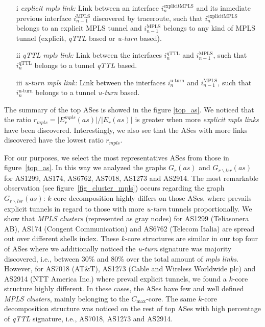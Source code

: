 \begin{itemize}
\item[i] \textit{explicit mpls link:} Link between an interface $i^{\text{explicitMPLS}}_{n}$  and its inmediate previous interface $i^{\text{MPLS}}_{n-1}$ discovered by traceroute, such that $i^{\text{explicitMPLS}}_{n}$ belongs to an explicit MPLS tunnel and $i^{\text{MPLS}}_{n-1}$ belongs to any kind of MPLS tunnel (explicit, \textit{qTTL} based or \textit{u-turn} based).

\item[ii] \textit{qTTL mpls link:} Link between the interfaces $i^{\text{qTTL}}_{n}$  and $i^{\text{MPLS}}_{n-1}$, such that $i^{\text{qTTL}}_{n}$ belongs to a tunnel \textit{qTTL} based.

\item[iii] \textit{u-turn mpls link:} Link between the interfaces $i^{\text{u-turn}}_{n}$  and $i^{\text{MPLS}}_{n-1}$, such that $i^{\text{u-turn}}_{n}$ belongs to a tunnel \textit{u-turn} based.

\end{itemize}

The summary of the top ASes is showed in the figure \ref{top_as}. 
We noticed that the ratio $r_{mpls}= \vert E^{mpls}_{r} (as) \vert /\vert E_{r} (as) \vert $  is greater when more  \textit{explicit mpls links} have been discovered. 
Interestingly, we also see that the ASes with more links discovered have the lowest ratio $r_{mpls}$. 

For our purposes, we select the most representatives ASes from those in figure~\ref{top_as}.
In this way we analyzed the graphs $G_{r}(as)$ and $G_{r\backslash lsr}(as)$ for AS1299, AS174, AS6762, AS7018, AS1273 and AS2914. 
The most remarkable observation (see figure~\ref{fig_cluster_mpls}) occurs regarding the graph $G_{r\backslash lsr}(as)$: $k$-core decomposition highly differs on those ASes, where prevails explicit tunnels in regard to those with more \textit{u-turn} tunnels proportionally. 
We show that \textit{MPLS clusters} (represented as gray nodes) for  AS1299 (Teliasonera AB), AS174 (Congent Communication) and AS6762 (Telecom Italia) are spread out over different shells index. 
These $k$-core structures are similar in our top four of ASes where we additionally noticed  the \textit{u-turn} signature was majority discovered, i.e., between $30\%$ and  $80\%$ over  the total amount of \textit{mpls links}. 
However, for AS7018 (AT\&T), AS1273 (Cable and Wireless Worldwide plc) and AS2914 (NTT America Inc.) %
 where prevail explicit tunnels, we found a $k$-core structure highly different.  
In these cases,  the ASes have few and well defined \textit{MPLS clusters}, mainly belonging to the $C_{\max}$-core. 
The same $k$-core decomposition structure was noticed  on the rest of top ASes with high percentage of \textit{qTTL} signature, i.e., AS7018, AS1273 and AS2914.

